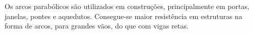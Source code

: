 \begin{multicols}{2}
    Os arcos parabólicos são utilizados em construções, principalmente em portas, janelas, pontes e aquedutos. Consegue-se maior resistência em estruturas na forma de arcos, para grandes vãos, do que com vigas retas. 

\begin{minipage}{0.5\columnwidth}
\centering
\end{minipage}%
\begin{minipage}{0.5\columnwidth}
\centering
    \end{minipage}
\end{multicols}

